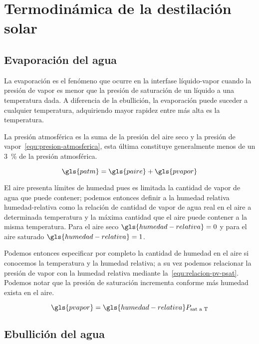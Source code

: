 \section{Termodinámica de la destilación solar}
	
	\subsection{Evaporación del agua}

		La evaporación es el fenómeno que ocurre en la interfase líquido-vapor cuando la presión de vapor es menor que la presión de saturación de un líquido a una temperatura dada. A diferencia de la ebullición, la evaporación puede suceder a cualquier temperatura, adquiriendo mayor rapidez entre más alta es la temperatura. \cite{cengel_transferencia_2010}

		La presión atmosférica es la suma de la presión del aire seco y la presión de vapor~\eqref{equ:presion-atmosferica}, esta última constituye generalmente menos de un \qty{3}{\percent} de la presión atmosférica.

		\begin{equation}\label{equ:presion-atmosferica}
			\gls{patm} = \gls{paire} + \gls{pvapor}
		\end{equation}

		El aire presenta límites de humedad pues es limitada la cantidad de vapor de agua que puede contener; podemos entonces definir a la humedad relativa \gls{humedad-relativa} como la relación de cantidad de vapor de agua real en el aire a determinada temperatura y la máxima cantidad que el aire puede contener a la misma temperatura. Para el aire seco $\gls{humedad-relativa} = 0$ y para el aire saturado $\gls{humedad-relativa} = 1$.

		Podemos entonces especificar por completo la cantidad de humedad en el aire si conocemos la temperatura y la humedad relativa; a su vez podemos relacionar la presión de vapor con la humedad relativa mediante la~\cref{equ:relacion-pv-psat}. Podemos notar que la presión de saturación incrementa conforme más humedad exista en el aire. \cite{cengel_termodinamica_2009}

		\begin{equation}\label{equ:relacion-pv-psat}
			\gls{pvapor} = \gls{humedad-relativa} P_{\text{sat a T}}
		\end{equation}
		
	\subsection{Ebullición del agua}

